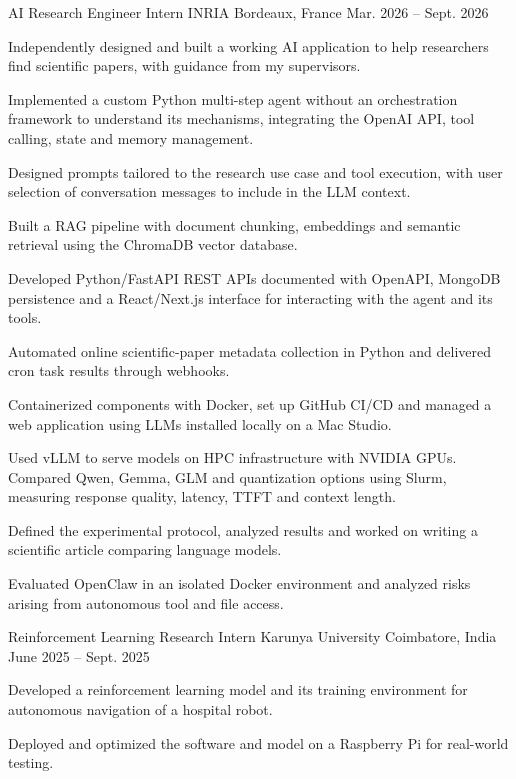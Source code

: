 
\begin{cventries}
  \cventry
    {AI Research Engineer Intern}
    {INRIA}
    {Bordeaux, France}
    {Mar. 2026 -- Sept. 2026}
    {
      \begin{cvitems}
        \item {Independently designed and built a working AI application to help researchers find scientific papers, with guidance from my supervisors.}
        \item {Implemented a custom Python multi-step agent without an orchestration framework to understand its mechanisms, integrating the OpenAI API, tool calling, state and memory management.}
        \item {Designed prompts tailored to the research use case and tool execution, with user selection of conversation messages to include in the LLM context.}
        \item {Built a RAG pipeline with document chunking, embeddings and semantic retrieval using the ChromaDB vector database.}
        \item {Developed Python/FastAPI REST APIs documented with OpenAPI, MongoDB persistence and a React/Next.js interface for interacting with the agent and its tools.}
        \item {Automated online scientific-paper metadata collection in Python and delivered cron task results through webhooks.}
        \item {Containerized components with Docker, set up GitHub CI/CD and managed a web application using LLMs installed locally on a Mac Studio.}
        \item {Used vLLM to serve models on HPC infrastructure with NVIDIA GPUs. Compared Qwen, Gemma, GLM and quantization options using Slurm, measuring response quality, latency, TTFT and context length.}
        \item {Defined the experimental protocol, analyzed results and worked on writing a scientific article comparing language models.}
        \item {Evaluated OpenClaw in an isolated Docker environment and analyzed risks arising from autonomous tool and file access.}
      \end{cvitems}
    }

  \cventry
    {Reinforcement Learning Research Intern}
    {Karunya University}
    {Coimbatore, India}
    {June 2025 -- Sept. 2025}
    {
      \begin{cvitems}
        \item {Developed a reinforcement learning model and its training environment for autonomous navigation of a hospital robot.}
        \item {Deployed and optimized the software and model on a Raspberry Pi for real-world testing.}
      \end{cvitems}
    }
\end{cventries}
